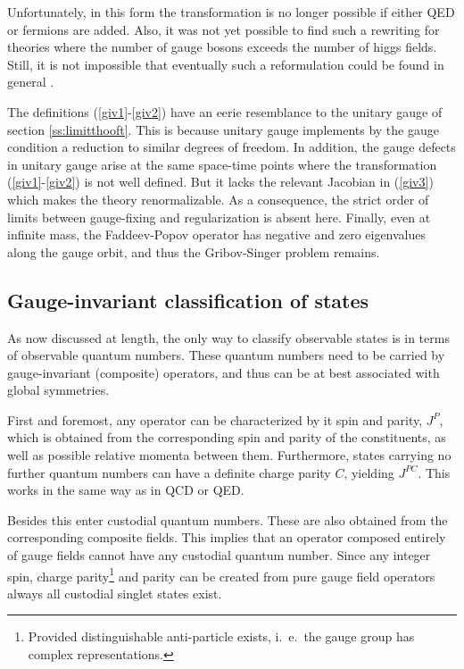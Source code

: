 \documentclass[final,twoside,12pt]{article}
\newcommand*{\pref}[1]{(\ref{#1})}
\newcommand*{\prefr}[2]{(\ref{#1}-\ref{#2})}
\newcommand*{\1}{1\!\!\!\bot}
\begin{document}
Unfortunately, in this form the transformation is no longer possible if either QED or fermions are added. Also, it was not yet possible to find such a rewriting for theories where the number of gauge bosons exceeds the number of higgs fields. Still, it is not impossible that eventually such a reformulation could be found in general \cite{Attard:2017sdn,Kondo:2018qus}. 

The definitions \prefr{giv1}{giv2} have an eerie resemblance to the unitary gauge of section \ref{ss:limitthooft}. This is because unitary gauge implements by the gauge condition a reduction to similar degrees of freedom. In addition, the gauge defects in unitary gauge arise at the same space-time points where the transformation \prefr{giv1}{giv2} is not well defined. But it lacks the relevant Jacobian in \pref{giv3} which makes the theory renormalizable. As a consequence, the strict order of limits between gauge-fixing and regularization is absent here. Finally, even at infinite mass, the Faddeev-Popov operator has negative and zero eigenvalues along the gauge orbit, and thus the Gribov-Singer problem remains.

\subsection{Gauge-invariant classification of states}\label{ss:classification}

As now discussed at length, the only way to classify observable states is in terms of observable quantum numbers. These quantum numbers need to be carried by gauge-invariant (composite) operators, and thus can be at best associated with global symmetries.

First and foremost, any operator can be characterized by it spin and parity, $J^P$, which is obtained from the corresponding spin and parity of the constituents, as well as possible relative momenta between them. Furthermore, states carrying no further quantum numbers can have a definite charge parity $C$, yielding $J^{PC}$. This works in the same way as in QCD or QED.

Besides this enter custodial quantum numbers. These are also obtained from the corresponding composite fields. This implies that an operator composed entirely of gauge fields cannot have any custodial quantum number. Since any integer spin, charge parity\footnote{Provided distinguishable anti-particle exists, i.\ e.\ the gauge group has complex representations.} and parity can be created from pure gauge field operators \cite{Chen:2005mg} always all custodial singlet states exist.
\end{document}
